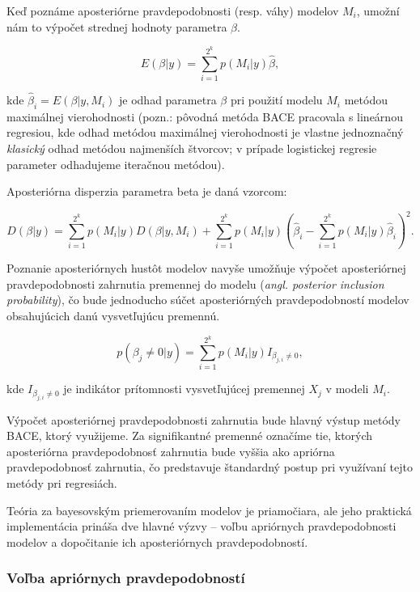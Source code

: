 Keď poznáme aposteriórne pravdepodobnosti (resp. váhy) modelov \( M_i \), umožní nám to výpočet strednej hodnoty parametra \( \beta \).

\begin{equation} \label{posterior_expected_value}
    E(\beta | y) = \sum_{i = 1}^{2^k} p(M_i | y) \hat{\beta},
\end{equation}

kde \( \hat{\beta}_i = E(\beta |y, M_i) \) je odhad parametra \( \beta \) pri použití modelu \( M_i \) metódou maximálnej vierohodnosti
(pozn.: pôvodná metóda BACE pracovala s lineárnou regresiou, kde odhad metódou maximálnej vierohodnosti je vlastne jednoznačný \emph{klasický} odhad metódou najmenších štvorcov;
v prípade logistickej regresie parameter odhadujeme iteračnou metódou).

Aposteriórna disperzia parametra beta je daná vzorcom:

\[
    D(\beta | y) = \sum_{i = 1}^{2^k} p(M_i | y) D(\beta | y, M_i) + \sum_{i = 1}^{2^k} p(M_i | y) \left( \hat{\beta}_i - \sum_{i = 1}^{2^k} p(M_i | y) \hat{\beta}_i \right)^2.
\]

Poznanie aposteriórnych hustôt modelov navyše umožňuje výpočet aposteriórnej pravdepodobnosti zahrnutia premennej do modelu (\emph{angl. posterior inclusion probability}),
čo bude jednoducho súčet aposteriórných pravdepodobností modelov obsahujúcich danú vysvetľujúcu premennú.

\begin{equation} \label{posterior_inclusion_probability}
    p(\beta_j \neq 0 | y) = \sum_{i = 1}^{2^k} p(M_i | y) I_{\beta_{j, i} \neq 0},
\end{equation}

kde \( I_{\beta_{j, i} \neq 0} \) je indikátor prítomnosti vysvetľujúcej premennej \( X_j \) v modeli \( M_i \).

Výpočet aposteriórnej pravdepodobnosti zahrnutia bude hlavný výstup metódy BACE, ktorý využijeme.
Za signifikantné premenné označíme tie, ktorých aposteriórna pravdepodobnosť zahrnutia bude vyššia ako apriórna pravdepodobnosť zahrnutia, čo predstavuje štandardný postup pri využívaní tejto metódy pri regresiách.

Teória za bayesovským priemerovaním modelov je priamočiara,
ale jeho praktická implementácia prináša dve hlavné výzvy – voľbu apriórnych pravdepodobnosti modelov a dopočitanie ich aposteriórnych pravdepodobností.

\subsubsection{Voľba apriórnych pravdepodobností}


